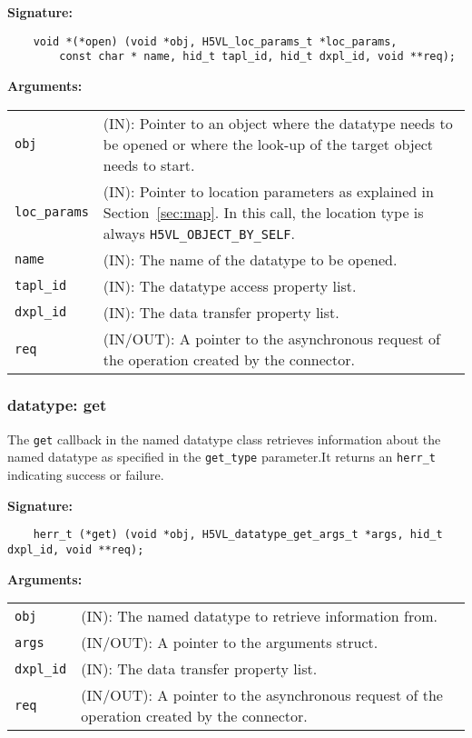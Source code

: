 \begin{mdframed}[style=bgbox]
\textbf{Signature:}
\begin{lstlisting}
    void *(*open) (void *obj, H5VL_loc_params_t *loc_params, 
        const char * name, hid_t tapl_id, hid_t dxpl_id, void **req);
\end{lstlisting}

\textbf{Arguments:}\\
\begin{tabular}{l p{13.5cm}}
  \texttt{obj} & (IN): Pointer to an object where the datatype needs
  to be opened or where the look-up of the target object needs to
  start.\\
  \texttt{loc\_params} & (IN): Pointer to location parameters as explained in
  Section~\ref{sec:map}. In this call, the location type is always \texttt{H5VL\_OBJECT\_BY\_SELF}. \\
  \texttt{name} & (IN): The name of the datatype to be opened.\\
  \texttt{tapl\_id} & (IN): The datatype access property list.\\
  \texttt{dxpl\_id} & (IN): The data transfer property list.\\
  \texttt{req} & (IN/OUT): A pointer to the asynchronous request of the
  operation created by the connector.\\
\end{tabular}
\end{mdframed}

\subsubsection{datatype: get}
The \texttt{get} callback in the named datatype class retrieves
information about the named datatype as specified in the \texttt{get\_type}
parameter.It returns an \texttt{herr\_t} indicating success or failure.\bigskip

\begin{mdframed}[style=bgbox]
\textbf{Signature:}
\begin{lstlisting}
    herr_t (*get) (void *obj, H5VL_datatype_get_args_t *args, hid_t dxpl_id, void **req);
\end{lstlisting}

\textbf{Arguments:}\\
\begin{tabular}{l p{13.5cm}}
  \texttt{obj} & (IN): The named datatype to retrieve information from.\\
  \texttt{args} & (IN/OUT): A pointer to the arguments struct.\\
  \texttt{dxpl\_id} & (IN): The data transfer property list.\\
  \texttt{req} & (IN/OUT): A pointer to the asynchronous request of the
  operation created by the connector.\\
\end{tabular}
\end{mdframed}

